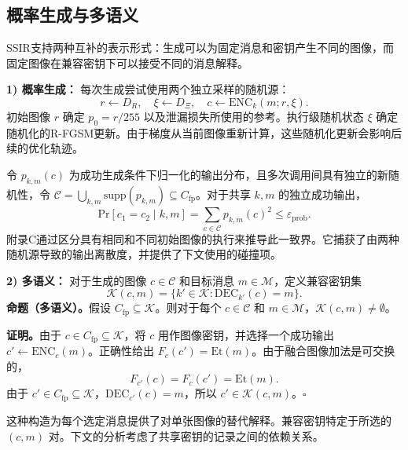 \subsection{概率生成与多语义}

SSIR支持两种互补的表示形式：生成可以为固定消息和密钥产生不同的图像，而固定图像在兼容密钥下可以接受不同的消息解释。

\textbf{1) 概率生成：}
每次生成尝试使用两个独立采样的随机源：
\begin{equation}
r \leftarrow D_R, \quad \xi \leftarrow D_\Xi, \quad c \leftarrow \mathrm{ENC}_k(m; r, \xi). \tag{13}
\end{equation}
初始图像 \(r\) 确定 \(p_0 = r/255\) 以及泄漏损失所使用的参考。执行级随机状态 \(\xi\) 确定随机化的R-FGSM更新。由于梯度从当前图像重新计算，这些随机化更新会影响后续的优化轨迹。

令 \(p_{k,m}(c)\) 为成功生成条件下归一化的输出分布，且多次调用间具有独立的新随机性，令 \(\mathcal{C} = \bigcup_{k,m} \mathrm{supp}(p_{k,m}) \subseteq C_{\mathrm{fp}}\)。对于共享 \(k, m\) 的独立成功输出，
\begin{equation}
\mathrm{Pr}[c_1 = c_2 \mid k, m] = \sum_{c \in \mathcal{C}} p_{k,m}(c)^2 \le \varepsilon_{\mathrm{prob}}. \tag{14}
\end{equation}
附录C通过区分具有相同和不同初始图像的执行来推导此一致界。它捕获了由两种随机源导致的输出离散度，并提供了下文使用的碰撞项。

\textbf{2) 多语义：}
对于生成的图像 \(c \in \mathcal{C}\) 和目标消息 \(m \in \mathcal{M}\)，定义兼容密钥集
\begin{equation}
\mathcal{K}(c, m) = \{ k' \in \mathcal{K} : \mathrm{DEC}_{k'}(c) = m \}. \tag{15}
\end{equation}
\textbf{命题（多语义）。}假设 \(C_{\mathrm{fp}} \subseteq \mathcal{K}\)。则对于每个 \(c \in \mathcal{C}\) 和 \(m \in \mathcal{M}\)，\(\mathcal{K}(c, m) \neq \emptyset\)。

\textbf{证明。}由于 \(c \in C_{\mathrm{fp}} \subseteq \mathcal{K}\)，将 \(c\) 用作图像密钥，并选择一个成功输出 \(c' \leftarrow \mathrm{ENC}_c(m)\)。正确性给出 \(F_c(c') = \mathrm{Et}(m)\)。由于融合图像加法是可交换的，
\begin{equation}
F_{c'}(c) = F_c(c') = \mathrm{Et}(m). \tag{16}
\end{equation}
由于 \(c' \in C_{\mathrm{fp}} \subseteq \mathcal{K}\)，\(\mathrm{DEC}_{c'}(c) = m\)，所以 \(c' \in \mathcal{K}(c, m)\)。\(\square\)

这种构造为每个选定消息提供了对单张图像的替代解释。兼容密钥特定于所选的 \((c, m)\) 对。下文的分析考虑了共享密钥的记录之间的依赖关系。
